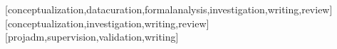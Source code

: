 \documentclass{textolivre}
\begin{document}
\printbibliography\label{sec-bib}


\begin{contributors}
[conceptualization,datacuration,formalanalysis,investigation,writing,review]
[conceptualization,investigation,writing,review]
[projadm,supervision,validation,writing]
\end{contributors}
\end{document}
